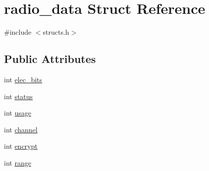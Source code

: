 \hypertarget{structradio__data}{\section{radio\-\_\-data Struct Reference}
\label{structradio__data}
}


{\ttfamily \#include $<$structs.\-h$>$}

\subsection*{Public Attributes}
\begin{DoxyCompactItemize}
\item 
int \hyperlink{structradio__data_a979087a195c4253ee9fe1913edd4fa4b}{elec\-\_\-bits}
\item 
int \hyperlink{structradio__data_a4335da12f27e590f42298c2794a2c3a3}{status}
\item 
int \hyperlink{structradio__data_acdf7274e14930ea7a9fa1d393482b1d7}{usage}
\item 
int \hyperlink{structradio__data_a0b1783d8c0fd34039fe105448606b66e}{channel}
\item 
int \hyperlink{structradio__data_ac0c2b129bde556a3e3ea8690e1c4adca}{encrypt}
\item 
int \hyperlink{structradio__data_a013678e8f4bdb0bcd7365b1e289b908d}{range}
\end{DoxyCompactItemize}


